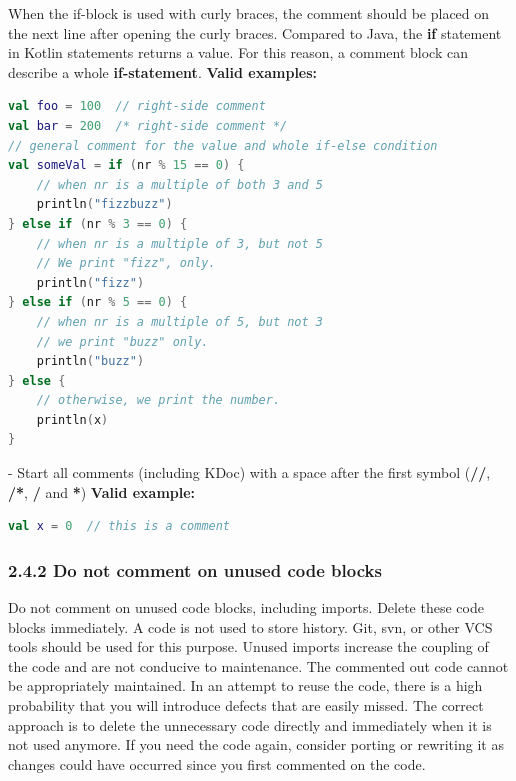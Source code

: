 When the if-block is used with curly braces, the comment should be placed on the next line after opening the curly braces.
Compared to Java, the \textbf{if} statement in Kotlin statements returns a value. For this reason, a comment block can describe a whole \textbf{if-statement}.
\textbf{Valid examples:}
\begin{lstlisting}[language=Kotlin]
val foo = 100  // right-side comment
val bar = 200  /* right-side comment */
// general comment for the value and whole if-else condition
val someVal = if (nr % 15 == 0) {
    // when nr is a multiple of both 3 and 5
    println("fizzbuzz")
} else if (nr % 3 == 0) {
    // when nr is a multiple of 3, but not 5
    // We print "fizz", only.
    println("fizz")
} else if (nr % 5 == 0) {
    // when nr is a multiple of 5, but not 3
    // we print "buzz" only.
    println("buzz")
} else {
    // otherwise, we print the number.
    println(x)
}
\end{lstlisting}
- Start all comments (including KDoc) with a space after the first symbol (\textbf{//}, \textbf{/*}, \textbf{/} and \textbf{*})
\textbf{Valid example:}
\begin{lstlisting}[language=Kotlin]
val x = 0  // this is a comment
\end{lstlisting}
\subsubsection*{\textbf{2.4.2 Do not comment on unused code blocks}}
\leavevmode\newline
\label{sec:2.4.2}
Do not comment on unused code blocks, including imports. Delete these code blocks immediately.
A code is not used to store history. Git, svn, or other VCS tools should be used for this purpose.
Unused imports increase the coupling of the code and are not conducive to maintenance. The commented out code cannot be appropriately maintained.
In an attempt to reuse the code, there is a high probability that you will introduce defects that are easily missed.
The correct approach is to delete the unnecessary code directly and immediately when it is not used anymore.
If you need the code again, consider porting or rewriting it as changes could have occurred since you first commented on the code. 
